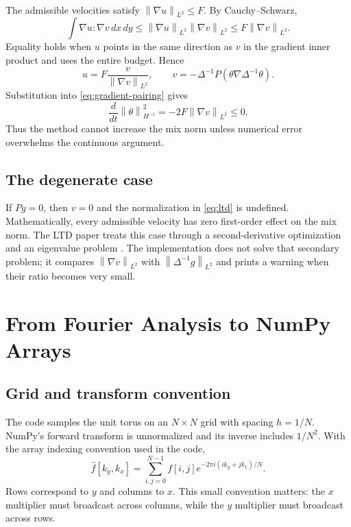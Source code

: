 \documentclass[12pt,a4paper]{article}
\newcommand{\norm}[1]{\left\lVert#1\right\rVert}
\newcommand{\lapinv}{\Delta^{-1}}
\newcommand{\Proj}{P}
\newcommand{\dx}{\,dx\,dy}
\theoremstyle{definition}
\begin{document}
The admissible velocities satisfy $\norm{\nabla u}_{L^2}\le F$. By
Cauchy--Schwarz,
\begin{equation}
  \int\nabla u:\nabla v\dx
  \le \norm{\nabla u}_{L^2}\norm{\nabla v}_{L^2}
  \le F\norm{\nabla v}_{L^2}.
\end{equation}
Equality holds when $u$ points in the same direction as $v$ in the
gradient inner product and uses the entire budget. Hence
\begin{equation}
  \boxed{u=F\frac{v}{\norm{\nabla v}_{L^2}},\qquad
  v=-\lapinv\Proj(\theta\nabla\lapinv\theta).}
  \label{eq:ltd}
\end{equation}
Substitution into \eqref{eq:gradient-pairing} gives
\begin{equation}
  \frac{d}{dt}\norm{\theta}_{H^{-1}}^2
  =-2F\norm{\nabla v}_{L^2}\le0.
\end{equation}
Thus the method cannot increase the mix norm unless numerical error
overwhelms the continuous argument.

\subsection{The degenerate case}

If $\Proj g=0$, then $v=0$ and the normalization in \eqref{eq:ltd} is
undefined. Mathematically, every admissible velocity has zero first-order
effect on the mix norm. The LTD paper treats this case through a
second-derivative optimization and an eigenvalue problem \cite{LTD2011}.
The implementation does not solve that secondary problem; it compares
$\norm{\nabla v}_{L^2}$ with $\norm{\lapinv g}_{L^2}$ and prints a warning
when their ratio becomes very small.

\section{From Fourier Analysis to NumPy Arrays}

\subsection{Grid and transform convention}

The code samples the unit torus on an $N\times N$ grid with spacing
$h=1/N$. NumPy's forward transform is unnormalized and its inverse includes
$1/N^2$. With the array indexing convention used in the code,
\begin{equation}
  \widehat f[k_y,k_x]
  =\sum_{i,j=0}^{N-1}f[i,j]
    e^{-2\pi i(ik_y+jk_x)/N}.
\end{equation}
Rows correspond to $y$ and columns to $x$. This small convention matters:
the $x$ multiplier must broadcast across columns, while the $y$ multiplier
must broadcast across rows.
\end{document}
